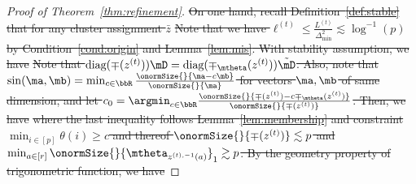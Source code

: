 \documentclass[lettersize,onecolumn,journal]{IEEEtran}
\theoremstyle{definition}
\theoremstyle{definition}
\providecommand{\DIFdeltex}[1]{{\protect\color{red}\sout{#1}}}                      %
\providecommand{\DIFdel}[1]{\texorpdfstring{\DIFdeltex{#1}}{}} %
\begin{document}
\begin{proof}[Proof of Theorem~\ref{thm:refinement}]
\DIFdel{On one hand, recall Definition~\ref{def:stable} that for any cluster assignment $\bar z$
    }%
\DIFdel{Note that we have $\ell^{(t)} \leq \frac{L^{(t)}}{\Delta_{\min}^2} \lesssim \log^{-1}(p) $ by Condition~\ref{cond:origin} and Lemma~\ref{lem:mis}. With stability assumption, we have 
    }%
\DIFdel{Note that $\text{diag}(\mp(z^{(t)})) \mD = \text{diag}(\mp_{\mtheta}(z^{(t)})) \tilde \mD$. Also, note that $\sin(\ma,\mb) =\min_{c \in \bbR} \frac{ \onormSize{}{\ma - c\mb} }{\onormSize{}{\ma}}$ for vectors $\ma,\mb$ of same dimension, and let $c_0 = \argmin_{c \in \bbR} \frac{\onormSize{}{\mp(z^{(t)}) - c\mp_{\mtheta}(z^{(t)})}}{\onormSize{}{\mp(z^{(t)})}}$. Then, we have
    }%
\DIFdel{where the last inequality follows Lemma~\ref{lem:membership} and constraint $\min_{i \in [p]}\theta(i) \geq c$ and thereof $\onormSize{}{ \mp(z^{(t)})} \lesssim p$ and $\min_{a \in [r]} \onormSize{}{\mtheta_{z^{(t),-1}(a)} }_1  \gtrsim p$. By the geometry property of trigonometric function, we have
    }%

\end{proof}
\end{document}
